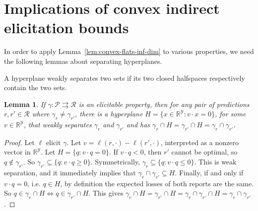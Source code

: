 \documentclass[11pt]{article} %
\newcommand{\Comments}{1}
\newcommand{\mytodo}[2]{\ifnum\Comments=1%
	\todo[linecolor=#1!80!black,backgroundcolor=#1,bordercolor=#1!80!black]{#2}\fi}
\newcommand{\btw}[1]{}%
\newcommand{\reals}{\mathbb{R}}
\newcommand{\R}{\mathcal{R}}
\renewcommand{\P}{\mathcal{P}}
\newcommand{\Y}{\mathcal{Y}}
\newcommand{\toto}{\rightrightarrows}
\newtheorem{lemma}{Lemma}
\begin{document}
\section{Implications of convex indirect elicitation bounds}\label{app:implications-of-bounds}
In order to apply Lemma~\ref{lem:convex-flats-inf-dim} to various properties, we need the following lemmas about separating hyperplanes.

A hyperplane weakly separates two sets if its two closed halfspaces respectively contain the two sets.
\begin{lemma}\label{lem:intersect-levelsets}
	If $\gamma: \P \toto \R$ is an elicitable property, then for any pair of predictions $r, r' \in \R$ where $\gamma_r \neq \gamma_{r'}$, there is a hyperplane $H = \{x \in \reals^{\Y} : v \cdot x = 0\}$, for some $v \in \reals^\Y$, that weakly separates $\gamma_r$ and $\gamma_{r'}$ and has $\gamma_r \cap H = \gamma_{r'} \cap H = \gamma_r \cap \gamma_{r'}$.
\end{lemma}
\begin{proof}
	\btw{Bo: the proof holds as written for the case where the level sets have empty intersection.}
	Let $\ell$ elicit $\gamma$.
	Let $v = \ell(r, \cdot) - \ell(r', \cdot)$, interpreted as a nonzero vector in $\reals^\Y$.
	Let $H = \{ q : v \cdot q = 0 \}$.
	If $v \cdot q < 0$, then $r'$ cannot be optimal, so $q \not\in \gamma_{r'}$.
	So $\gamma_{r'} \subseteq \{ q : v \cdot q \geq 0 \}$.
	Symmetrically, $\gamma_r \subseteq \{ q : v \cdot q \leq 0 \}$.
	This is weak separation, and it immediately implies that $\gamma_r \cap \gamma_{r'} \subseteq H$.
	Finally, if and only if $v \cdot q = 0$, i.e. $q \in H$, by definition the expected losses of both reports are the same.
	So $q \in \gamma_r \cap H \iff q \in \gamma_{r'} \cap H$.
	This gives $\gamma_r \cap H = \gamma_{r'} \cap H = \gamma_r \cap \gamma_{r'} \cap H = \gamma_r \cap \gamma_{r'}$.
\end{proof}
\end{document}
